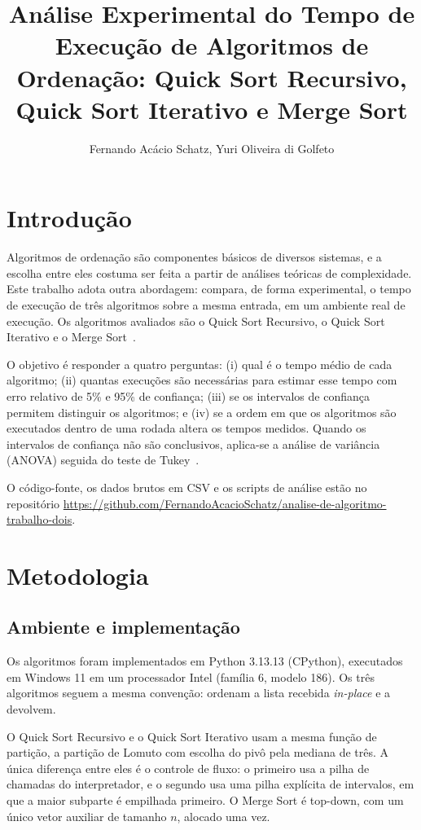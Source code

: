 \documentclass[12pt]{article}
\title{Análise Experimental do Tempo de Execução de Algoritmos de Ordenação:
  Quick Sort Recursivo, Quick Sort Iterativo e Merge Sort}
\author{Fernando Acácio Schatz\inst{1}, Yuri Oliveira di Golfeto\inst{1}}
\begin{document}
\maketitle

\section{Introdução}

Algoritmos de ordenação são componentes básicos de diversos sistemas, e a
escolha entre eles costuma ser feita a partir de análises teóricas de
complexidade. Este trabalho adota outra abordagem: compara, de forma
experimental, o tempo de execução de três algoritmos sobre a mesma entrada, em
um ambiente real de execução. Os algoritmos avaliados são o Quick Sort
Recursivo, o Quick Sort Iterativo e o Merge Sort~\cite{hoare1962,cormen2009}.

O objetivo é responder a quatro perguntas: (i) qual é o tempo médio de cada
algoritmo; (ii) quantas execuções são necessárias para estimar esse tempo com
erro relativo de 5\% e 95\% de confiança; (iii) se os intervalos de confiança
permitem distinguir os algoritmos; e (iv) se a ordem em que os algoritmos são
executados dentro de uma rodada altera os tempos medidos. Quando os intervalos
de confiança não são conclusivos, aplica-se a análise de variância (ANOVA)
seguida do teste de Tukey~\cite{montgomery2017,tukey1949}.

O código-fonte, os dados brutos em CSV e os scripts de análise estão no
repositório \url{https://github.com/FernandoAcacioSchatz/analise-de-algoritmo-trabalho-dois}.

\section{Metodologia}

\subsection{Ambiente e implementação}

Os algoritmos foram implementados em Python 3.13.13 (CPython), executados em
Windows 11 em um processador Intel (família 6, modelo 186). Os três
algoritmos seguem a mesma convenção: ordenam a lista recebida \emph{in-place} e
a devolvem.

O Quick Sort Recursivo e o Quick Sort Iterativo usam a mesma função de
partição, a partição de Lomuto com escolha do pivô pela mediana de três. A
única diferença entre eles é o controle de fluxo: o primeiro usa a pilha de
chamadas do interpretador, e o segundo usa uma pilha explícita de intervalos,
em que a maior subparte é empilhada primeiro. O Merge Sort é top-down, com um
único vetor auxiliar de tamanho $n$, alocado uma vez.
\end{document}
